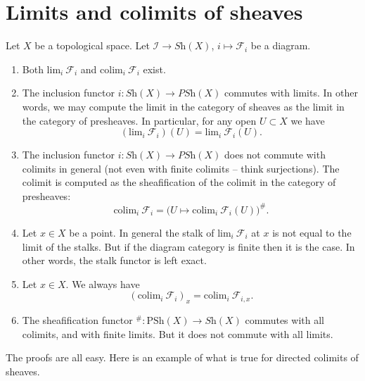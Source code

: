 \section{Limits and colimits of sheaves}
\label{section-limits-sheaves}

\noindent
Let $X$ be a topological space.
Let $\mathcal{I} \to \textit{Sh}(X)$, $i \mapsto \mathcal{F}_i$
be a diagram.
\begin{enumerate}
\item Both $\text{lim}_i\ \mathcal{F}_i$ and $\text{colim}_i\ \mathcal{F}_i$
exist.
\item The inclusion functor $i : \textit{Sh}(X) \to \textit{PSh}(X)$
commutes with limits. In other words, we may compute the limit
in the category of sheaves as the limit in the category of
presheaves. In particular, for any open $U \subset X$ we have
$$
(\text{lim}_i\ \mathcal{F}_i)(U) = \text{lim}_i\ \mathcal{F}_i(U).
$$
\item The inclusion functor $i : \textit{Sh}(X) \to \textit{PSh}(X)$
does not commute with colimits in general (not even
with finite colimits -- think surjections). The colimit is
computed as the sheafification of the colimit in the
category of presheaves:
$$
\text{colim}_i\ \mathcal{F}_i =
\Big(U \mapsto \text{colim}_i\ \mathcal{F}_i(U)\Big)^\#.
$$
\item Let $x \in X$ be a point. In general the stalk of
$\text{lim}_i\ \mathcal{F}_i$ at $x$ is not equal to
the limit of the stalks. But if the diagram category is finite
then it is the case. In other words, the stalk functor is
left exact.
\item Let $x \in X$. We always have
$$
(\text{colim}_i\ \mathcal{F}_i)_x = \text{colim}_i\ \mathcal{F}_{i, x}.
$$
\item The sheafification functor
${}^\# : \text{PSh}(X) \to \textit{Sh}(X)$ commutes with all
colimits, and with finite limits. But it does not commute
with all limits.
\end{enumerate}
The proofs are all easy. Here is an example of what is true for directed
colimits of sheaves.

